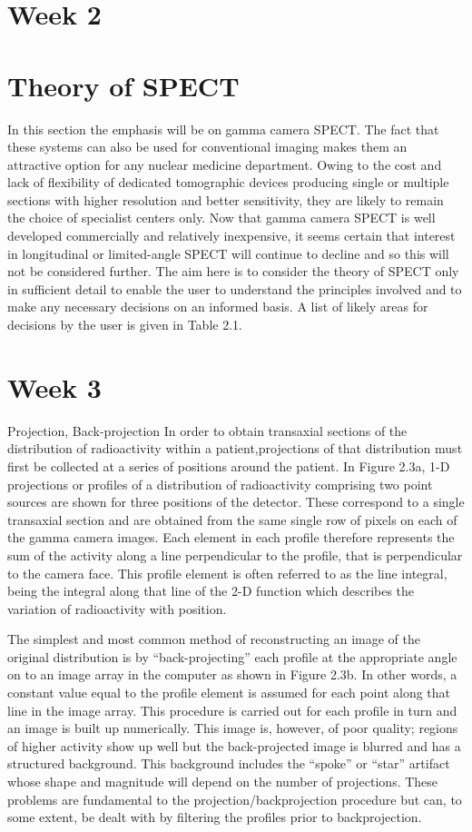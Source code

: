 \documentclass[12pt]{article}
\begin{document}
\section*{Week 2}
\section*{ Theory of SPECT}
In this section the emphasis will be on gamma camera SPECT. The fact that these systems can also be used for conventional imaging makes them an attractive option for any nuclear medicine department. Owing to the cost and lack of flexibility of dedicated tomographic devices producing single or multiple sections with higher resolution and better sensitivity, they are likely to remain the choice of specialist centers only. Now that gamma camera SPECT is well developed commercially and relatively inexpensive, it seems certain that interest in longitudinal or limited-angle SPECT will continue to decline and so this will not be considered further. The aim here is to consider the theory of SPECT
only in sufficient detail to enable the user to understand the principles involved and to make any necessary decisions on an informed basis. A list of likely areas for decisions by the user is given in Table 2.1.

\section*{Week 3}
Projection, Back-projection
In order to obtain transaxial sections of the distribution of radioactivity within a patient,projections of that distribution must first be collected at a series of positions around the patient. In Figure 2.3a, 1-D projections or profiles of a distribution of radioactivity comprising two
point sources are shown for three positions of the detector. These correspond to a single transaxial section and are obtained from the same single row of pixels on each of the gamma camera images. Each element in each profile therefore represents the sum of the activity along a line perpendicular to the profile, that is perpendicular to the camera face. This profile element is often referred to as the line integral, being the integral along that line of the 2-D function which describes the variation of radioactivity with position.

The simplest and most common method of reconstructing an image of the original distribution is by “back-projecting” each profile at the appropriate angle on to an image array in the computer as shown in Figure 2.3b. In other words, a constant value equal to the profile element is assumed for each point along that line in the image array. This procedure is carried out for each profile in turn
and an image is built up numerically. This image is, however, of poor quality; regions of higher activity show up well but the back-projected image is blurred and has a structured background. This background includes the “spoke” or “star” artifact whose shape and magnitude will depend on the number of projections. These problems are fundamental to the projection/backprojection procedure but can, to some extent, be dealt with by filtering the profiles prior to backprojection.
\end{document}
